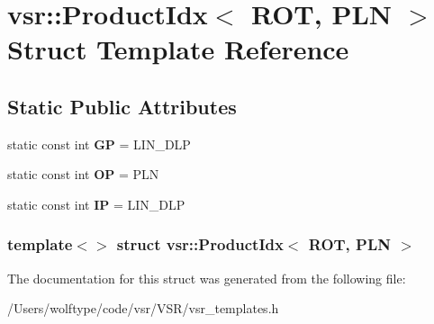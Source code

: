 \hypertarget{structvsr_1_1_product_idx_3_01_r_o_t_00_01_p_l_n_01_4}{\section{vsr\-:\-:Product\-Idx$<$ R\-O\-T, P\-L\-N $>$ Struct Template Reference}
\label{structvsr_1_1_product_idx_3_01_r_o_t_00_01_p_l_n_01_4}
}
\subsection*{Static Public Attributes}
\begin{DoxyCompactItemize}
\item 
\hypertarget{structvsr_1_1_product_idx_3_01_r_o_t_00_01_p_l_n_01_4_a588e8b93872dac290f18b80a07a89191}{static const int {\bfseries G\-P} = L\-I\-N\-\_\-\-D\-L\-P}\label{structvsr_1_1_product_idx_3_01_r_o_t_00_01_p_l_n_01_4_a588e8b93872dac290f18b80a07a89191}

\item 
\hypertarget{structvsr_1_1_product_idx_3_01_r_o_t_00_01_p_l_n_01_4_a17ba74e99075ecb771ccce2fc54a05ae}{static const int {\bfseries O\-P} = P\-L\-N}\label{structvsr_1_1_product_idx_3_01_r_o_t_00_01_p_l_n_01_4_a17ba74e99075ecb771ccce2fc54a05ae}

\item 
\hypertarget{structvsr_1_1_product_idx_3_01_r_o_t_00_01_p_l_n_01_4_a03738c0afce8e49308c2da4d9012b45e}{static const int {\bfseries I\-P} = L\-I\-N\-\_\-\-D\-L\-P}\label{structvsr_1_1_product_idx_3_01_r_o_t_00_01_p_l_n_01_4_a03738c0afce8e49308c2da4d9012b45e}

\end{DoxyCompactItemize}
\subsubsection*{template$<$$>$ struct vsr\-::\-Product\-Idx$<$ R\-O\-T, P\-L\-N $>$}



The documentation for this struct was generated from the following file\-:\begin{DoxyCompactItemize}
\item 
/\-Users/wolftype/code/vsr/\-V\-S\-R/vsr\-\_\-templates.\-h\end{DoxyCompactItemize}
